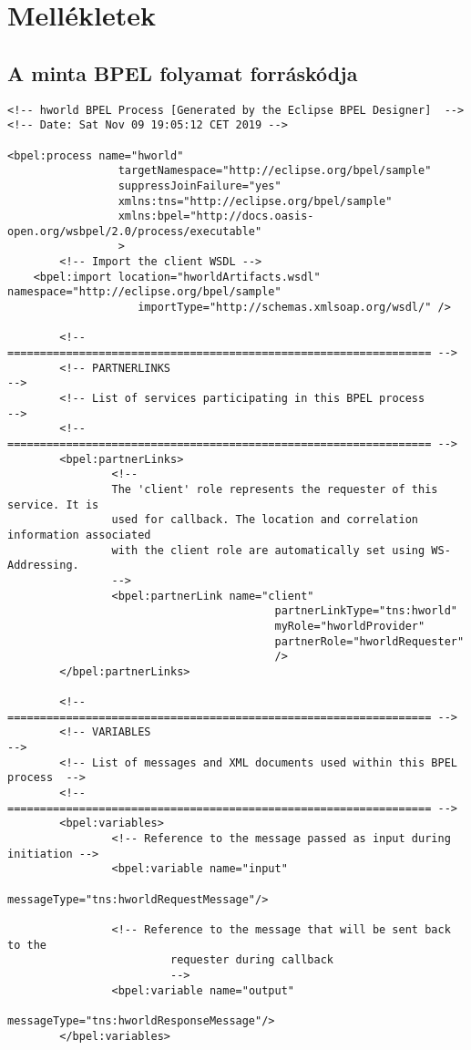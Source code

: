 \chapter{Mellékletek}
\section{A minta BPEL folyamat forráskódja}
\begin{verbatim}
<!-- hworld BPEL Process [Generated by the Eclipse BPEL Designer]  -->
<!-- Date: Sat Nov 09 19:05:12 CET 2019 -->

<bpel:process name="hworld"
				 targetNamespace="http://eclipse.org/bpel/sample"
				 suppressJoinFailure="yes"
				 xmlns:tns="http://eclipse.org/bpel/sample"
				 xmlns:bpel="http://docs.oasis-open.org/wsbpel/2.0/process/executable"
				 >
		<!-- Import the client WSDL -->
	<bpel:import location="hworldArtifacts.wsdl" namespace="http://eclipse.org/bpel/sample" 
					importType="http://schemas.xmlsoap.org/wsdl/" />
					
		<!-- ================================================================= -->         
		<!-- PARTNERLINKS                                                      -->
		<!-- List of services participating in this BPEL process               -->
		<!-- ================================================================= -->         
		<bpel:partnerLinks>
				<!--
				The 'client' role represents the requester of this service. It is 
				used for callback. The location and correlation information associated
				with the client role are automatically set using WS-Addressing.
				-->
				<bpel:partnerLink name="client"
										 partnerLinkType="tns:hworld"
										 myRole="hworldProvider"
										 partnerRole="hworldRequester"
										 />
		</bpel:partnerLinks>
	
		<!-- ================================================================= -->         
		<!-- VARIABLES                                                         -->
		<!-- List of messages and XML documents used within this BPEL process  -->
		<!-- ================================================================= -->         
		<bpel:variables>
				<!-- Reference to the message passed as input during initiation -->
				<bpel:variable name="input"
									messageType="tns:hworldRequestMessage"/>
									
				<!-- Reference to the message that will be sent back to the 
						 requester during callback
						 -->
				<bpel:variable name="output"
									messageType="tns:hworldResponseMessage"/>
		</bpel:variables>


\end{verbatim}
